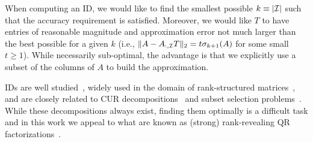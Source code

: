 \begin{remarks}
\hspace{-0.8em}
When computing an ID, we would like to find the smallest possible $k\equiv\lvert\mathcal{I}\rvert$ such that the accuracy requirement is satisfied. Moreover, we would like $T$ to have entries of reasonable magnitude and approximation error not much larger than the best possible for a given $k$ (i.e., $\|A - A_{:,\mathcal{I}}T\|_2 = t \sigma_{k+1}(A)$ for some small $t \geq 1$). While necessarily sub-optimal, the advantage is that we explicitly use a subset of the columns of $A$ to build the approximation.
\end{remarks}

IDs are well studied~\cite{cheng2005compression,martinsson2011randomized}, widely used in the domain of rank-structured matrices~\cite{ho2012fast,ho2015hierarchical,ho2016hierarchical,martinsson2005fast,martinsson2019fast,minden2017recursive}, and are closely related to CUR decompositions~\cite{mahoney2009cur,voronin2017efficient} and subset selection problems~\cite{boutsidis2009improved,civril2009selecting,tropp2009column}. While these decompositions always exist, finding them optimally is a difficult task and in this work we appeal to what are known as (strong) rank-revealing QR factorizations~\cite{businger1965linear,chan1992some,chandrasekaran1994rank,gu1996efficient,hong1992rank}.


